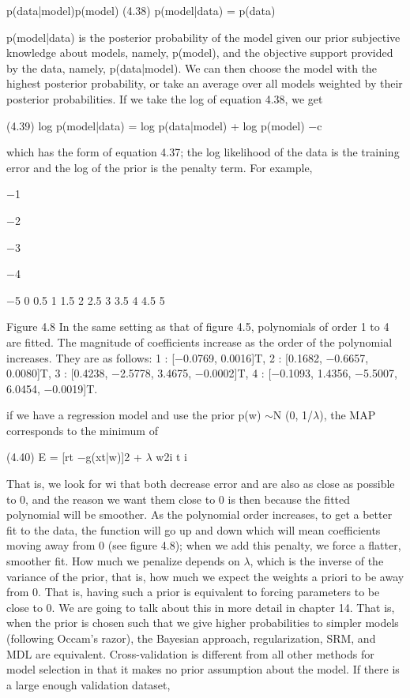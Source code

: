 p(data|model)p(model) (4.38) p(model|data) = p(data)

p(model|data) is the posterior probability of the model given our prior subjective knowledge about models, namely, p(model), and the objective support provided by the data, namely, p(data|model). We can then choose the model with the highest posterior probability, or take an average over all models weighted by their posterior probabilities. If we take the log of equation 4.38, we get

(4.39) log p(model|data) = log p(data|model) + log p(model) $-$c

which has the form of equation 4.37; the log likelihood of the data is the training error and the log of the prior is the penalty term. For example,

$-$1

$-$2

$-$3

$-$4

$-$5 0 0.5 1 1.5 2 2.5 3 3.5 4 4.5 5

Figure 4.8 In the same setting as that of figure 4.5, polynomials of order 1 to 4 are fitted. The magnitude of coefficients increase as the order of the polynomial increases. They are as follows: 1 : [$-$0.0769, 0.0016]T, 2 : [0.1682, $-$0.6657, 0.0080]T, 3 : [0.4238, $-$2.5778, 3.4675, $-$0.0002]T, 4 : [$-$0.1093, 1.4356, $-$5.5007, 6.0454, $-$0.0019]T.

if we have a regression model and use the prior p(w) $\sim$N (0, 1/$\lambda$), the MAP corresponds to the minimum of

(4.40) E = [rt $-$g(xt|w)]2 + $\lambda$ w2i t i

That is, we look for wi that both decrease error and are also as close as possible to 0, and the reason we want them close to 0 is then because the fitted polynomial will be smoother. As the polynomial order increases, to get a better fit to the data, the function will go up and down which will mean coefficients moving away from 0 (see figure 4.8); when we add this penalty, we force a flatter, smoother fit. How much we penalize depends on $\lambda$, which is the inverse of the variance of the prior, that is, how much we expect the weights a priori to be away from 0. That is, having such a prior is equivalent to forcing parameters to be close to 0. We are going to talk about this in more detail in chapter 14. That is, when the prior is chosen such that we give higher probabilities to simpler models (following Occam’s razor), the Bayesian approach, regularization, SRM, and MDL are equivalent. Cross-validation is different from all other methods for model selection in that it makes no prior assumption about the model. If there is a large enough validation dataset,

